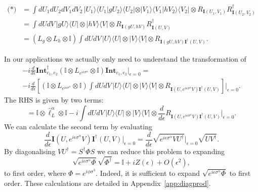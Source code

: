\documentclass[12pt]{amsart}
\def\CAv{\mathbf{Int}}
\theoremstyle{definition}
\theoremstyle{remark}
\numberwithin{equation}{section}
\begin{document}
\begin{equation}
	\begin{split}
	\text{(*)} &=  \int dU_1dU_2dV_1dV_2 \, |U_1\rangle\langle U_1|gU_2\rangle\langle U_2| \otimes  |V_1\rangle\langle V_1|hV_2\rangle\langle V_2| \otimes R_{\mathbf{I}(U_1,V_1)}R_{\mathbf{I}(U_2,V_2)}^\dag \\
	  &=  \int dUdV \, |gU\rangle\langle U| \otimes  |hV\rangle\langle V| \otimes R_{\mathbf{I}(gU,hV)}R_{\mathbf{I}(U,V)}^\dag \\
	  &=  (L_g\otimes L_h\otimes \mathbb{I})\int dUdV \, |U\rangle\langle U| \otimes  |V\rangle\langle V| \otimes R_{\mathbf{I}(gU,hV) \mathbf{I}^\dag(U,V)}. 
	\end{split}
\end{equation}

In our applications we actually only need to understand the transformation of 
\begin{multline}
	-i\frac{d}{d\epsilon}\CAv_{e_1,e_2}^\dag \left(\mathbb{I}\otimes L_{e^{i\epsilon \sigma^{\alpha}}}\otimes \mathbb{I}\right)\CAv_{e_1,e_2}\Big|_{\epsilon = 0} = \\ -i\frac{d}{d\epsilon}\left[(\mathbb{I}\otimes L_{e^{i\epsilon \sigma^{\alpha}}}\otimes \mathbb{I})\int dUdV \, |U\rangle\langle U| \otimes  |V\rangle\langle V| \otimes R_{\mathbf{I}(U,e^{i\epsilon \sigma^\alpha}V) \mathbf{I}^\dag(U,V)}\right]\bigg|_{\epsilon = 0}.
\end{multline}
The RHS is given by two terms: 
\begin{equation}
	= \mathbb{I}\otimes \widehat{\ell}_L^{\alpha}\otimes \mathbb{I}  -i\int dUdV \, |U\rangle\langle U| \otimes  |V\rangle\langle V| \otimes \frac{d}{d\epsilon} R_{\mathbf{I}(U,e^{i\epsilon \sigma^\alpha}V) \mathbf{I}^\dag(U,V)}\bigg|_{\epsilon = 0}.
\end{equation}
We can calculate the second term by evaluating
\begin{equation}
	\frac{d}{d\epsilon} \mathbf{I}(U,e^{i\epsilon \sigma^\alpha}V) \mathbf{I}^\dag(U,V) \bigg|_{\epsilon = 0} = \frac{d}{d\epsilon} \sqrt{e^{i\epsilon \sigma^{\alpha}}VU^\dag } \bigg|_{\epsilon = 0} \sqrt{U V^\dag}.
\end{equation}
By diagonalising $VU^\dag = S^\dag \Phi S$ we can reduce this problem to expanding 
\begin{equation}
	\sqrt{ e^{i\epsilon \sigma^\alpha}\Phi}\sqrt{\Phi^\dag} = \mathbb{I} + i Z(\epsilon) + O(\epsilon^2),
\end{equation}
to first order, where $\Phi = e^{i\phi \sigma^3}$. Indeed, it is sufficient to expand $\sqrt{ e^{i\epsilon \sigma^\alpha}\Phi}$ to first order. These calculations are detailed in Appendix~\ref{app:diagprod}.
\end{document}
